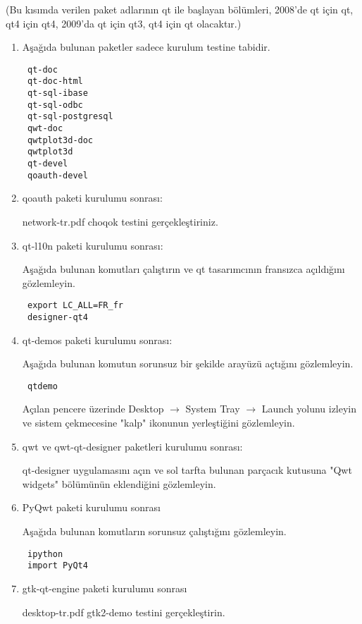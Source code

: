 \documentclass[a4paper,10pt]{article}
\begin{document}
(Bu kısımda verilen paket adlarının qt ile başlayan bölümleri, 2008'de qt için qt, qt4 için qt4, 2009'da qt için qt3, qt4 için qt olacaktır.)
\begin{enumerate}
 \item Aşağıda bulunan paketler sadece kurulum testine tabidir.
\begin{verbatim}
 qt-doc
 qt-doc-html
 qt-sql-ibase
 qt-sql-odbc
 qt-sql-postgresql
 qwt-doc
 qwtplot3d-doc
 qwtplot3d
 qt-devel
 qoauth-devel
\end{verbatim}

\item qoauth paketi kurulumu sonrası:

network-tr.pdf choqok testini gerçekleştiriniz.

\item qt-l10n paketi kurulumu sonrası:

Aşağıda bulunan komutları çalıştırın ve qt tasarımcının fransızca açıldığını gözlemleyin.
\begin{verbatim}
 export LC_ALL=FR_fr
 designer-qt4
\end{verbatim}

\item  qt-demos paketi kurulumu sonrası:

Aşağıda bulunan komutun sorunsuz bir şekilde arayüzü açtığını gözlemleyin.
\begin{verbatim}
 qtdemo
\end{verbatim}

Açılan pencere üzerinde Desktop $\rightarrow$ System Tray $\rightarrow$ Launch yolunu izleyin ve sistem çekmecesine "kalp" ikonunun yerleştiğini gözlemleyin.

\item qwt ve qwt-qt-designer paketleri kurulumu sonrası:

qt-designer uygulamasını açın ve sol tarfta bulunan parçacık kutusuna "Qwt widgets" bölümünün eklendiğini gözlemleyin.

\item PyQwt paketi kurulumu sonrası

Aşağıda bulunan komutların sorunsuz çalıştığını gözlemleyin.
\begin{verbatim}
 ipython
 import PyQt4
\end{verbatim}


\item gtk-qt-engine paketi kurulumu sonrası

desktop-tr.pdf gtk2-demo testini gerçekleştirin.


\end{enumerate}
\end{document}
